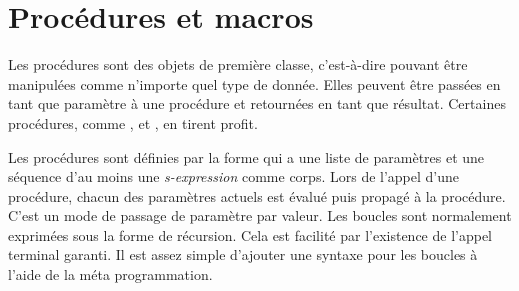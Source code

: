 \section{Procédures et macros}
\label{sec:proc_and_macro}

Les procédures sont des objets de première classe, c'est-à-dire pouvant
être manipulées comme n'importe quel type de donnée. Elles peuvent
être passées en tant que paramètre à une procédure et retournées en tant que
résultat.  Certaines procédures, comme ,  et
, en tirent profit.

Les procédures sont définies par la forme  qui a une liste de
paramètres et une séquence d'au moins une \textit{s-expression} comme corps.
Lors de l'appel d'une procédure, chacun des paramètres actuels est évalué puis
propagé à la procédure. C'est un mode de passage de paramètre par valeur. Les
boucles sont normalement exprimées sous la forme de récursion.  Cela est
facilité par l'existence de l'appel terminal garanti.  Il est assez simple
d'ajouter une syntaxe pour les boucles à l'aide de la méta programmation.






